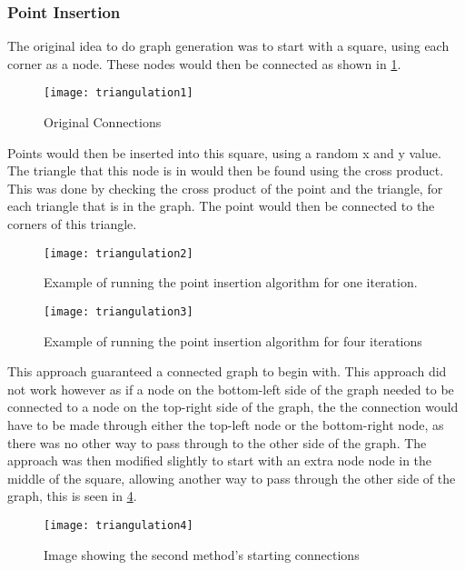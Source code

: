 \subsubsection{Point Insertion}
	The original idea to do graph generation was to start with a square, using each corner as a node. These nodes would then be connected as shown in \ref{fig:triangulation1}.\\

\begin{figure}[H]
	\texttt{[image: triangulation1]}
	\centering
	\caption{Original Connections}
	\label{fig:triangulation1}
\end{figure}

	Points would then be inserted into this square, using a random x and y value.  The triangle that this node is in would then be found using the cross product. This was done by checking the cross product of the point and the triangle, for each triangle that is in the graph. The point would then be connected to the corners of this triangle.\\

\begin{figure}[H]
	\texttt{[image: triangulation2]}
	\centering
	\caption{Example of running the point insertion algorithm for one iteration.}
	\label{fig:triangulation2}
\end{figure}

\begin{figure}[h]
	\texttt{[image: triangulation3]}
	\centering
	\caption{Example of running the point insertion algorithm for four iterations}
	\label{fig:triangulation3}
\end{figure}

	This approach guaranteed a connected graph to begin with. This approach did not work however as if a node on the bottom-left side of the graph needed to be connected to a node on the top-right side of the graph, the the connection would have to be made through either the top-left node or the bottom-right node, as there was no other way to pass through to the other side of the graph. The approach was then modified slightly to start with an extra node node in the middle of the square, allowing another way to pass through the other side of the graph, this is seen in \ref{fig:triangulation4}.

\begin{figure}[H]
	\texttt{[image: triangulation4]}
	\centering
	\caption{Image showing the second method's starting connections}
	\label{fig:triangulation4}
\end{figure}
	
